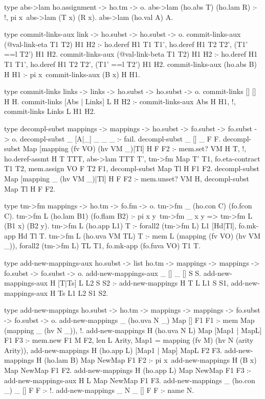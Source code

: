 \begin{elpicode}
  
  type abs->lam ho.assignment -> ho.tm -> o.
  abs->lam (ho.abs T) (ho.lam R)  :- !, pi x\ abs->lam (T x) (R x).
  abs->lam (ho.val A) A.

  type commit-links-aux link -> ho.subst -> ho.subst -> o.
  commit-links-aux (@val-link-eta T1 T2) H1 H2 :- 
    ho.deref H1 T1 T1', ho.deref H1 T2 T2',
    (T1' ==l T2') H1 H2.
  commit-links-aux (@val-link-beta T1 T2) H1 H2 :- 
    ho.deref H1 T1 T1', ho.deref H1 T2 T2',
    (T1' ==l T2') H1 H2.
  commit-links-aux (ho.abs B) H H1 :- 
    pi x\ commit-links-aux (B x) H H1.

  type commit-links links -> links -> ho.subst -> ho.subst -> o.
  commit-links [] [] H H.
  commit-links [Abs | Links] L H H2 :- 
    commit-links-aux Abs H H1, !, commit-links Links L H1 H2.

  type decompl-subst mappings -> mappings -> ho.subst -> 
    fo.subst -> fo.subst -> o.
  decompl-subst _ [A|_] _ _ _ :- fail.
  decompl-subst _ [] _ F F.
  decompl-subst Map [mapping (fv VO) (hv VM _)|Tl] H F F2 :- 
    mem.set? VM H T, !, 
    ho.deref-assmt H T TTT,
    abs->lam TTT T', tm->fm Map T' T1, 
    fo.eta-contract T1 T2, mem.assign VO F T2 F1,
    decompl-subst Map Tl H F1 F2. 
  decompl-subst Map [mapping _ (hv VM _)|Tl] H F F2 :- 
    mem.unset? VM H, decompl-subst Map Tl H F F2.

  type tm->fm mappings -> ho.tm -> fo.fm -> o.
  tm->fm _ (ho.con C)  (fo.fcon C).
  tm->fm L (ho.lam B1) (fo.flam B2) :- 
    pi x y\ tm->fm _ x y => tm->fm L (B1 x) (B2 y).
  tm->fm L (ho.app L1) T :- forall2 (tm->fm L) L1 [Hd|Tl], 
    fo.mk-app Hd Tl T.
  tm->fm L (ho.uva VM TL) T :- mem L (mapping (fv VO) (hv VM _)), 
    forall2 (tm->fm L) TL T1, fo.mk-app (fo.fuva VO) T1 T.

  type add-new-mappings-aux ho.subst -> list ho.tm -> mappings -> 
        mappings ->  fo.subst -> fo.subst -> o.
  add-new-mappings-aux _ [] _ [] S S.
  add-new-mappings-aux H [T|Ts] L L2 S S2 :- 
    add-new-mappings H T L L1 S S1, 
    add-new-mappings-aux H Ts L1 L2 S1 S2.

  type add-new-mappings ho.subst -> ho.tm -> mappings -> 
      mappings ->  fo.subst -> fo.subst -> o.
  add-new-mappings _ (ho.uva N _) Map [] F1 F1 :- 
    mem Map (mapping _ (hv N _)), !.
  add-new-mappings H (ho.uva N L) Map [Map1 | MapL] F1 F3 :-
    mem.new F1 M F2,
    len L Arity, Map1 = mapping (fv M) (hv N (arity Arity)),
    add-new-mappings H (ho.app L) [Map1 | Map] MapL F2 F3.
  add-new-mappings H (ho.lam B) Map NewMap F1 F2 :- 
    pi x\ add-new-mappings H (B x) Map NewMap F1 F2.
  add-new-mappings H (ho.app L) Map NewMap F1 F3 :- 
    add-new-mappings-aux H L Map NewMap F1 F3.
  add-new-mappings _ (ho.con _) _ [] F F :- !.
  add-new-mappings _ N _ [] F F :- name N.


\end{elpicode}
